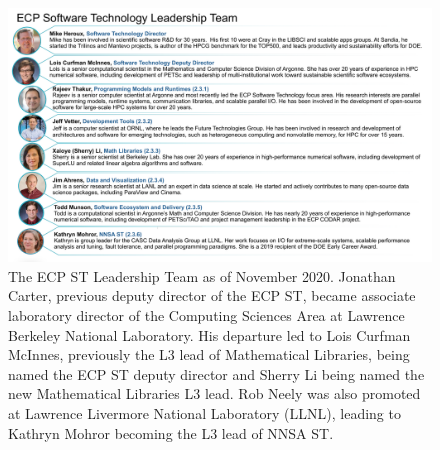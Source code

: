 \begin{figure}
	\centering
	\includegraphics[width=0.9\linewidth]{ECP-ST-Leads}
	\caption{The ECP ST Leadership Team as of November 2020. Jonathan Carter, previous deputy director of the ECP ST, became associate laboratory director of the Computing Sciences Area at Lawrence Berkeley National Laboratory. His departure led to Lois Curfman McInnes, previously the L3 lead of Mathematical Libraries, being named the ECP ST deputy director and Sherry Li being named the new Mathematical Libraries L3 lead.  Rob Neely was also promoted at Lawrence Livermore National Laboratory (LLNL), leading to Kathryn Mohror becoming the L3 lead of NNSA ST.}
	\label{fig:ecpstleads}
\end{figure}

